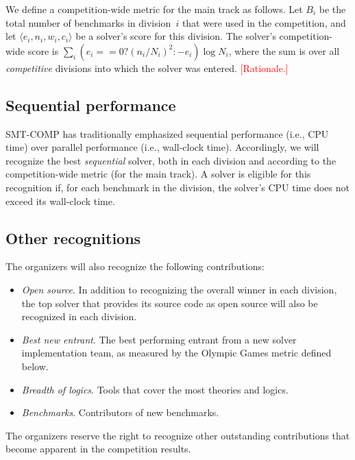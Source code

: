 \documentclass[12pt]{article}
\newcommand{\remark}[1]{{\small\textcolor{red}{[#1]}}}
\begin{document}
We define a competition-wide metric for the main track as follows.
Let $B_i$ be the total number of benchmarks in division~$i$ that were
used in the competition, and let $\langle e_i, n_i, w_i, c_i\rangle$
be a solver's score for this division.  The solver's competition-wide
score is $\sum_i (e_i == 0 ? (n_i/N_i)^2 : -e_i) \log N_i$, where the
sum is over all \emph{competitive} divisions into which the solver was
entered.  \remark{Rationale.}


\subsection{Sequential performance}

SMT-COMP has traditionally emphasized sequential performance (i.e.,
CPU time) over parallel performance (i.e., wall-clock time).
Accordingly, we will recognize the best \emph{sequential} solver, both
in each division and according to the competition-wide metric (for the
main track).  A solver is eligible for this recognition if, for each
benchmark in the division, the solver's CPU time does not exceed its
wall-clock time.

\subsection{Other recognitions}

The organizers will also recognize the following contributions:
%
\begin{itemize}
\item {\em Open source}. In addition to recognizing the overall winner
  in each division, the top solver that provides its source code as
  open source will also be recognized in each division.
\item {\em Best new entrant}. The best performing entrant from a new
  solver implementation team, as measured by the Olympic Games metric
  defined below.
\item {\em Breadth of logics}. Tools that cover the most theories and
  logics.
\item {\em Benchmarks}. Contributors of new benchmarks.
\end{itemize}
%
The organizers reserve the right to recognize other outstanding
contributions that become apparent in the competition results.
\end{document}
